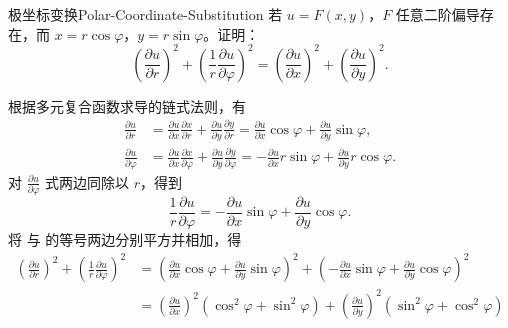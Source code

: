 \begin{problem}{极坐标变换}{Polar-Coordinate-Substitution}
    若 $u = F(x, y)$，$F$ 任意二阶偏导存在，而 $x = r \cos \varphi$，$y = r \sin \varphi$。证明：
    \begin{equation}
        \left(\frac{\partial u}{\partial r}\right)^2 + \left(\frac{1}{r} \frac{\partial u}{\partial \varphi}\right)^2 = \left(\frac{\partial u}{\partial x}\right)^2 + \left(\frac{\partial u}{\partial y}\right)^2.
    \end{equation}
\end{problem}

\begin{myproof}
    根据多元复合函数求导的链式法则，有
    \begin{equation}
        \label{eq:chain-rule-1}
        \begin{aligned}
            \frac{\partial u}{\partial r}       & = \frac{\partial u}{\partial x} \frac{\partial x}{\partial r} + \frac{\partial u}{\partial y} \frac{\partial y}{\partial r} = \frac{\partial u}{\partial x} \cos \varphi + \frac{\partial u}{\partial y} \sin \varphi,                  \\
            \frac{\partial u}{\partial \varphi} & = \frac{\partial u}{\partial x} \frac{\partial x}{\partial \varphi} + \frac{\partial u}{\partial y} \frac{\partial y}{\partial \varphi} = -\frac{\partial u}{\partial x} r \sin \varphi + \frac{\partial u}{\partial y} r \cos \varphi.
        \end{aligned}
    \end{equation}
    对 $\frac{\partial u}{\partial \varphi}$ 式两边同除以 $r$，得到
    \begin{equation}
        \label{eq:chain-rule-2}
        \frac{1}{r} \frac{\partial u}{\partial \varphi} = -\frac{\partial u}{\partial x} \sin \varphi + \frac{\partial u}{\partial y} \cos \varphi.
    \end{equation}
    将  与  的等号两边分别平方并相加，得
    \begin{equation}
        \begin{aligned}
            \left(\frac{\partial u}{\partial r}\right)^2 + \left(\frac{1}{r} \frac{\partial u}{\partial \varphi}\right)^2 & = \left( \frac{\partial u}{\partial x} \cos \varphi + \frac{\partial u}{\partial y} \sin \varphi \right)^2 + \left( -\frac{\partial u}{\partial x} \sin \varphi + \frac{\partial u}{\partial y} \cos \varphi \right)^2 \\
                                                                                                                          & = \left( \frac{\partial u}{\partial x} \right)^2 \left( \cos^2 \varphi + \sin^2 \varphi \right) + \left( \frac{\partial u}{\partial y} \right)^2 \left( \sin^2 \varphi + \cos^2 \varphi \right)                        \\

\end{aligned}
\end{equation}
\end{myproof}

